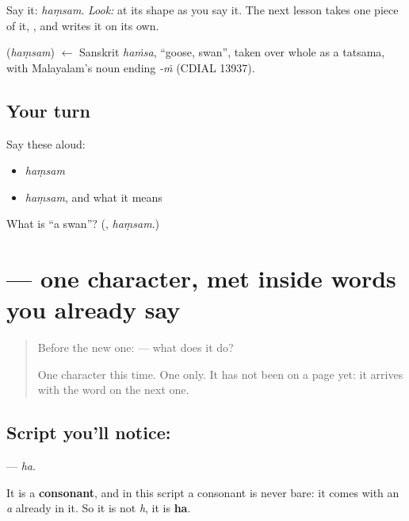Say it: \emph{haṃsam}. \emph{Look:} at its shape as you say it. The next lesson takes one piece of it, \textbf{}, and writes it on its own.

\begin{cousinweb}
\textbf{} (\emph{haṃsam}) $\leftarrow$ Sanskrit \emph{haṁsa}, \textquotedblleft{}goose, swan\textquotedblright{}, taken over whole as a tatsama, with Malayalam's noun ending \emph{-ṁ} (CDIAL 13937).
\end{cousinweb}

\subsection*{Your turn}
Say these aloud:

\begin{itemize}
\raggedright
  \item \emph{haṃsam}
  \item \emph{haṃsam}, and what it means
\end{itemize}

\begin{tcolorbox}[breakable,colback=teal!4,colframe=teal!35!black,title={Before you move on}]
What is \textquotedblleft{}a swan\textquotedblright{}? (\textbf{}, \emph{haṃsam}.)
\end{tcolorbox}
\section[\texorpdfstring{\ml{ഹ} (ha)}{ഹ (ha)}]{ — one character, met inside words you already say}

\label{lesson:ML-S127-letter-ha}



\begin{quote}
Before the new one:  — what does it do?

One character this time. One only. It has not been on a page yet: it arrives with the word on the next one.
\end{quote}

\subsection*{Script you'll notice: }
\textbf{} — \emph{ha}.

It is a \textbf{consonant}, and in this script a consonant is never bare: it comes with an \emph{a} already in it. So it is not \emph{h}, it is \textbf{ha}.

